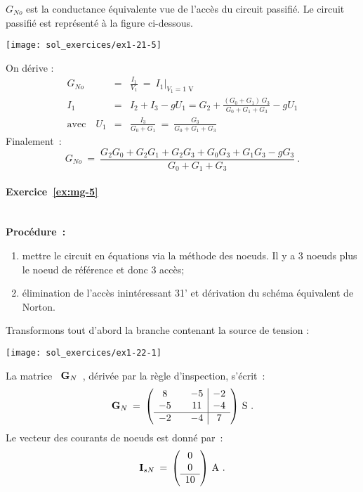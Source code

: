 $G_{No}$ est la conductance équivalente vue de l'accès du circuit
passifié. Le circuit passifié est représenté à la figure ci-dessous.
\begin{center}
\texttt{[image: sol\_exercices/ex1-21-5]}
\end{center}
On dérive : 
\begin{eqnarray*}
G_{No} &=& \frac{I_1}{V_1} \: = \: \left. I_1 \right|_{V_1=1 \text{~V}}\\
I_1 &=& I_2+ I_3 - gU_1 = G_2 + \frac{(G_0+G_1)\, G_3}{G_0+G_1+G_3} - gU_1\\
\text{avec}\quad U_1 & =& \frac{I_3}{G_0+G_1} \: = \: \frac{G_3}{G_0+G_1+G_3}
\end{eqnarray*}
Finalement~: 
\[ G_{No} \: = \: \frac{G_2G_0 + G_2G_1 + G_2G_3 + G_0G_3 + G_1G_3 - gG_3}{G_0+G_1+G_3}~. \]

\paragraph{Exercice~\ref{ex:mg-5}}~\\%
{\bf Procédure~:}
\begin{enumerate}
	\item mettre le circuit en équations via la méthode des noeuds. Il y a
	3 noeuds plus le noeud de référence et donc 3 accès;
	\item élimination de l'accès inintéressant 31' et dérivation du schéma équivalent de Norton.
\end{enumerate}


Transformons tout d'abord la branche contenant la source de tension :
\begin{center}
	\texttt{[image: sol\_exercices/ex1-22-1]}
\end{center}

La matrice \ ${\bf G}_N$~, dérivée par la règle d'inspection, s'écrit~:
\[ {\bf G}_N \: = \: \left( \begin{array}{ccc|c}
8 && -5 &-2\\
-5 && 11 & -4 \\\hline
-2 && -4 & 7
\end{array} \right)\, \text{S~.} \]
Le vecteur des courants de noeuds est donné par~:
\[ {\bf I}_{sN} \: = \, \left( \begin{array}{c} 0 \\ 0 \\\hline 10 \end{array} \right) \, \text{A~.}\]

